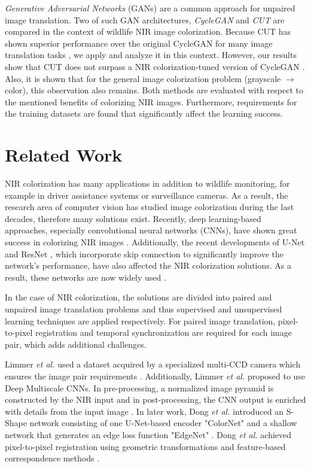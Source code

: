\documentclass[a4paper,11pt, DIV=12]{scrartcl}
\begin{document}
\textit{Generative Adversarial Networks} (GANs) are a common approach for unpaired image translation.
Two of such GAN architectures, \textit{CycleGAN} \cite{mehri2019colorizing} and \textit{CUT} \cite{cut} are compared in the context of wildlife NIR image colorization.
Because CUT has shown superior performance over the original CycleGAN for many image translation tasks \cite{cut}, we apply and analyze it in this context.
However, our results show that CUT does not surpass a NIR colorization-tuned version of CycleGAN \cite{mehri2019colorizing}.
Also, it is shown that for the general image colorization problem (grayscale $\rightarrow$ color), this observation also remains.
Both methods are evaluated with respect to the mentioned benefits of colorizing NIR images.
Furthermore, requirements for the training datasets are found that significantly affect the learning success.

\section{Related Work}
NIR colorization has many applications in addition to wildlife monitoring, for example in driver assistance systems or surveillance cameras.
As a result, the research area of computer vision has studied image colorization during the last decades, therefore many solutions exist.
Recently, deep learning-based approaches, especially convolutional neural networks (CNNs), have shown great success in colorizing NIR images \cite{limmer2016infrared}.
Additionally, the recent developments of U-Net \cite{unet} and ResNet \cite{resnet}, which incorporate skip connection to significantly improve the network's performance, have also affected
the NIR colorization solutions. As a result, these networks are now widely used \cite{cyclegan_orig,mehri2019colorizing,cut,dong2018infrared}.

In the case of NIR colorization, the solutions are divided into paired and unpaired image translation problems and thus supervised and unsupervised learning techniques are applied respectively.
For paired image translation, pixel-to-pixel registration and temporal synchronization are required for each image pair, which adds additional challenges.

Limmer \textit{et al.} used a dataset acquired by a specialized multi-CCD camera which ensures the image pair requirements \cite{limmer2016infrared}.
Additionally, Limmer \textit{et al.} proposed to use Deep Multiscale CNNs.
In pre-processing, a normalized image pyramid is constructed by the NIR input and in post-processing, the CNN output is enriched with details from the input image \cite{limmer2016infrared}.
In later work, Dong \textit{et al.} introduced an S-Shape network consisting of one U-Net-based encoder "ColorNet" and a shallow network that generates an edge loss function "EdgeNet" \cite{dong2018infrared}.
Dong \textit{et al.} achieved pixel-to-pixel registration using geometric transformations and feature-based correspondence methods \cite{dong2018infrared}.
\end{document}
